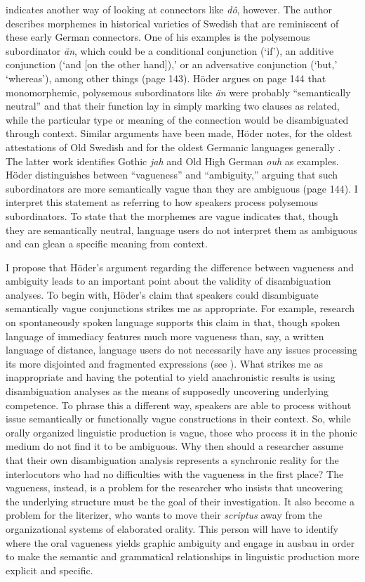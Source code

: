 \citet[141--144]{Höder2010} indicates another way of looking at connectors like \textit{dô}, however. The author describes morphemes in historical varieties of Swedish that are reminiscent of these early German connectors. One of his examples is the polysemous subordinator \textit{än}, which could be a conditional conjunction (‘if’), an additive conjunction (‘and [on the other hand]),’ or an adversative conjunction (‘but,' ‘whereas’), among other things (page 143). Höder argues on page 144 that monomorphemic, polysemous subordinators like \textit{än} were probably “semantically neutral” and that their function lay in simply marking two clauses as related, while the particular type or meaning of the connection would be disambiguated through context. Similar arguments have been made, Höder notes, for the oldest attestations of Old Swedish \citep{Kotcheva2002} and for the oldest Germanic languages generally \citep{Braunmüller1995}. The latter work identifies Gothic \textit{jah} and Old High German \textit{ouh} as examples. Höder distinguishes between “vagueness” and “ambiguity,” arguing that such subordinators are more semantically vague than they are ambiguous (page 144). I interpret this statement as referring to how speakers process polysemous subordinators. To state that the morphemes are vague indicates that, though they are semantically neutral, language users do not interpret them as ambiguous and can glean a specific meaning from context.

I propose that Höder’s argument regarding the difference between vagueness and ambiguity leads to an important point about the validity of disambiguation analyses. To begin with, Höder’s claim that speakers could disambiguate semantically vague conjunctions strikes me as appropriate. For example, research on spontaneously spoken language supports this claim in that, though spoken language of immediacy features much more vagueness than, say, a written language of distance, language users do not necessarily have any issues processing its more disjointed and fragmented expressions (see ). What strikes me as inappropriate and having the potential to yield anachronistic results is using disambiguation analyses as the means of supposedly uncovering underlying competence. To phrase this a different way, speakers are able to process without issue semantically or functionally vague constructions in their context. So, while orally organized linguistic production is vague, those who process it in the phonic medium do not find it to be ambiguous. Why then should a researcher assume that their own disambiguation analysis represents a synchronic reality for the interlocutors who had no difficulties with the vagueness in the first place? The vagueness, instead, is a problem for the researcher who insists that uncovering the underlying structure must be the goal of their investigation. It also become a problem for the literizer, who wants to move their \textit{scriptus} away from the organizational systems of elaborated orality. This person will have to identify where the oral vagueness yields graphic ambiguity and engage in ausbau in order to make the semantic and grammatical relationships in linguistic production more explicit and specific.

